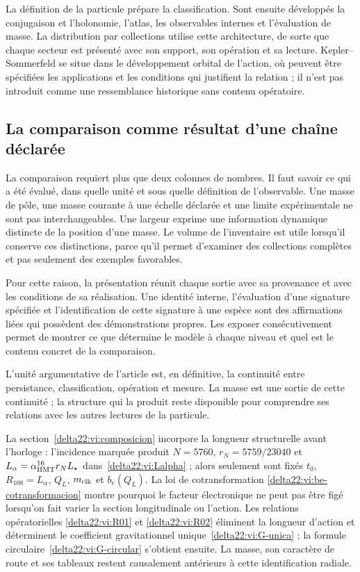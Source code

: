 La définition de la particule prépare la classification. Sont ensuite
développés la conjugaison et l’holonomie, l’atlas, les observables
internes et l’évaluation de masse. La distribution par collections utilise
cette architecture, de sorte que chaque secteur est présenté avec son support,
son opération et sa lecture. Kepler--Sommerfeld se situe dans le développement
orbital de l’action, où peuvent être spécifiées les applications et les
conditions qui justifient la relation ; il n’est pas introduit comme une
ressemblance historique sans contenu opératoire.


\subsection{La comparaison comme résultat d’une chaîne déclarée
}

La comparaison requiert plus que deux colonnes de nombres. Il faut savoir ce
qui a été évalué, dans quelle unité et sous quelle définition de l’observable. Une
masse de pôle, une masse courante à une échelle déclarée et une limite
expérimentale ne sont pas interchangeables. Une largeur exprime une information
dynamique distincte de la position d’une masse. Le volume de l’inventaire
est utile lorsqu’il conserve ces distinctions, parce qu’il permet d’examiner
des collections complètes et pas seulement des exemples favorables.


Pour cette raison, la présentation réunit chaque sortie avec sa provenance et
avec les conditions de sa réalisation. Une identité interne,
l’évaluation d’une signature spécifiée et l’identification de cette signature
à une espèce sont des affirmations liées qui possèdent des démonstrations
propres. Les exposer consécutivement permet de montrer ce que détermine le
modèle à chaque niveau et quel est le contenu concret de la comparaison.


L’unité argumentative de l’article est, en définitive, la continuité entre
persistance, classification, opération et mesure. La masse est une sortie
de cette continuité ; la structure qui la produit reste disponible
pour comprendre ses relations avec les autres lectures de la particule.


\par
La section~\ref{delta22:vi:composicion} incorpore la longueur structurelle
avant l’horloge : l’incidence marquée produit \(N=5760\),
\(r_N=5759/23040\) et
\(L_\alpha=\alpha_{\rm HMT}^{16}r_NL_\star\)
dans~\eqref{delta22:vi:Lalpha} ; alors seulement sont fixés \(t_0\),
\(R_{108}=L_\alpha\), \(Q_L\), \(m_{\rm clk}\) et
\(b_e(Q_L)\). La loi de cotransformation
\eqref{delta22:vi:be-cotransformacion} montre pourquoi le facteur
électronique ne peut pas être figé lorsqu’on fait varier la section longitudinale ou
l’action. Les relations opératorielles \eqref{delta22:vi:R01} et
\eqref{delta22:vi:R02} éliminent la longueur d’action et déterminent le
coefficient gravitationnel unique~\eqref{delta22:vi:G-unica} ; la formule
circulaire~\eqref{delta22:vi:G-circular} s’obtient ensuite. La masse, son
caractère de route et ses tableaux restent causalement antérieurs à cette
identification radiale.


